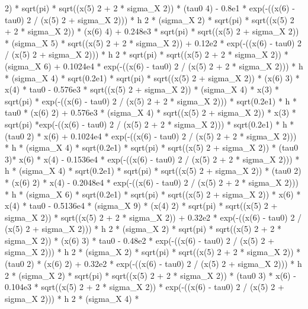 \begin{maplegroup}
 2) * sqrt(pi) * sqrt((x(5)  2 + 2 * sigma\_X  2)) * (tau0  4) - 0.8e1 * exp(-((x(6) - tau0)  2 / (x(5)  2 + sigma\_X  2))) * h  2 * (sigma\_X  2) * sqrt(pi) * sqrt((x(5)  2 + 2 * sigma\_X  2)) * (x(6)  4) + 0.248e3 * sqrt(pi) * sqrt((x(5)  2 + sigma\_X  2)) * (sigma\_X  5) * sqrt((x(5)  2 + 2 * sigma\_X  2)) + 0.12e2 * exp(-((x(6) - tau0)  2 / (x(5)  2 + sigma\_X  2))) * h  2 * sqrt(pi) * sqrt((x(5)  2 + 2 * sigma\_X  2)) * (sigma\_X  6) + 0.1024e4 * exp(-((x(6) - tau0)  2 / (x(5)  2 + 2 * sigma\_X  2))) * h * (sigma\_X  4) * sqrt(0.2e1) * sqrt(pi) * sqrt((x(5)  2 + sigma\_X  2)) * (x(6)  3) * x(4) * tau0 - 0.576e3 * sqrt((x(5)  2 + sigma\_X  2)) * (sigma\_X  4) * x(3) * sqrt(pi) * exp(-((x(6) - tau0)  2 / (x(5)  2 + 2 * sigma\_X  2))) * sqrt(0.2e1) * h * tau0 * (x(6)  2) + 0.576e3 * (sigma\_X  4) * sqrt((x(5)  2 + sigma\_X  2)) * x(3) * sqrt(pi) *exp(-((x(6) - tau0)  2 / (x(5)  2 + 2 * sigma\_X  2))) * sqrt(0.2e1) * h * (tau0  2) * x(6) + 0.1024e4 * exp(-((x(6) - tau0)  2 / (x(5)  2 + 2 * sigma\_X  2))) * h * (sigma\_X  4) * sqrt(0.2e1) * sqrt(pi) * sqrt((x(5)  2 + sigma\_X  2)) * (tau0  3)* x(6) * x(4) - 0.1536e4 * exp(-((x(6) - tau0)  2 / (x(5)  2 + 2 * sigma\_X  2))) * h * (sigma\_X  4) * sqrt(0.2e1) * sqrt(pi) * sqrt((x(5)  2 + sigma\_X  2)) * (tau0  2) * (x(6)  2) * x(4) - 0.2048e4 * exp(-((x(6) - tau0)  2 / (x(5)  2 + 2 * sigma\_X  2))) * h * (sigma\_X  6) * sqrt(0.2e1) * sqrt(pi) * sqrt((x(5)  2 + sigma\_X  2)) * x(6) * x(4) * tau0 - 0.5136e4 * (sigma\_X  9) * (x(4)  2) * sqrt(pi) * sqrt((x(5)  2 + sigma\_X  2)) * sqrt((x(5)  2 + 2 * sigma\_X  2)) + 0.32e2 * exp(-((x(6) - tau0)  2 / (x(5)  2 + sigma\_X  2))) * h  2 * (sigma\_X  2) * sqrt(pi) * sqrt((x(5)  2 + 2 * sigma\_X  2)) * (x(6)  3) * tau0 - 0.48e2 * exp(-((x(6) - tau0)  2 / (x(5)  2 + sigma\_X  2))) * h  2 * (sigma\_X  2) * sqrt(pi) * sqrt((x(5)  2 + 2 * sigma\_X  2)) * (tau0  2) * (x(6)  2) + 0.32e2 * exp(-((x(6) - tau0)  2 / (x(5)  2 + sigma\_X  2))) * h  2 * (sigma\_X  2) * sqrt(pi) * sqrt((x(5)  2 + 2 * sigma\_X  2)) * (tau0  3) * x(6) - 0.104e3 * sqrt((x(5)  2 + 2 * sigma\_X  2)) * exp(-((x(6) - tau0)  2 / (x(5)  2 + sigma\_X  2))) * h  2 * (sigma\_X  4) * 
\end{maplegroup}
